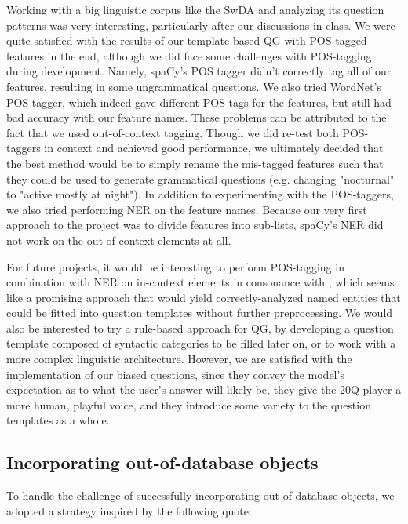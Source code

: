\documentclass[11pt,a4paper]{article}
\begin{document}
Working with a big linguistic corpus like the SwDA and analyzing its question patterns was very interesting, particularly after our discussions in class. 
We were quite satisfied with the results of our template-based QG with POS-tagged features in the end, although we did face some challenges with POS-tagging during development. 
Namely, spaCy's POS tagger didn't correctly tag all of our features, resulting in some ungrammatical questions.
We also tried WordNet’s \citep{Fellbaum2010} POS-tagger, which indeed gave different POS tags for the features, but still had bad accuracy with our feature names. 
These problems can be attributed to the fact that we used out-of-context tagging.
Though we did re-test both POS-taggers in context and achieved good performance, we ultimately decided that the best method would be to simply rename the mis-tagged features such that they could be used to generate grammatical questions (e.g. changing "nocturnal" to "active mostly at night"). 
In addition to experimenting with the POS-taggers, we also tried performing NER on the feature names. 
Because our very first approach to the project was to divide features into sub-lists, spaCy's NER did not work on the out-of-context elements at all. 

For future projects, it would be interesting to perform POS-tagging in combination with NER on in-context elements in consonance with \citet{Mandasari2019}, which seems like a promising approach that would yield correctly-analyzed named entities that could be fitted into question templates without further preprocessing. 
We would also be interested to try a rule-based approach for QG, by developing a question template composed of syntactic categories to be filled later on, or to work with a more complex linguistic architecture. 
However, we are satisfied with the implementation of our biased questions, since they convey the model's expectation as to what the user's answer will likely be, they give the 20Q player a more human, playful voice, and they introduce some variety to the question templates as a whole.


\subsection{Incorporating out-of-database objects}
\label{subsec:out-of-db}

To handle the challenge of successfully incorporating out-of-database objects, we adopted a strategy inspired by the following quote:
\end{document}
